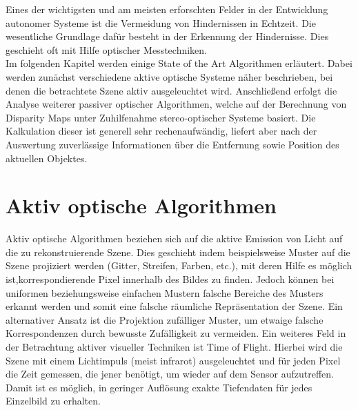 Eines der wichtigsten und am meisten erforschten Felder in der Entwicklung autonomer Systeme ist die Vermeidung von Hindernissen in Echtzeit. Die wesentliche Grundlage dafür besteht in der Erkennung der Hindernisse. Dies geschieht oft mit Hilfe optischer Messtechniken.\\

\noindent
Im folgenden Kapitel werden einige State of the Art Algorithmen erläutert. Dabei werden zunächst verschiedene aktive optische Systeme näher beschrieben, bei denen die betrachtete Szene aktiv ausgeleuchtet wird. Anschließend erfolgt die Analyse weiterer passiver optischer Algorithmen, welche auf der Berechnung von Disparity Maps unter Zuhilfenahme stereo-optischer Systeme basiert. Die Kalkulation dieser ist generell sehr rechenaufwändig, liefert aber nach der Auswertung zuverlässige Informationen über die Entfernung sowie Position des aktuellen Objektes.

\section{Aktiv optische Algorithmen}
\label{sec:kamera_basierte_he}
Aktiv optische Algorithmen beziehen sich auf die aktive Emission von Licht auf die zu rekonstruierende Szene. Dies geschieht indem beispielsweise Muster auf die Szene projiziert werden (Gitter, Streifen, Farben, etc.), mit deren Hilfe es möglich ist,korrespondierende Pixel innerhalb des Bildes zu finden. Jedoch können bei uniformen beziehungsweise einfachen Mustern falsche Bereiche des Musters erkannt werden und somit eine falsche räumliche Repräsentation der Szene. Ein alternativer Ansatz ist die Projektion zufälliger Muster, um etwaige falsche Korrespondenzen durch bewusste Zufälligkeit zu vermeiden. Ein weiteres Feld in der Betrachtung aktiver visueller Techniken ist Time of Flight. Hierbei wird die Szene mit einem Lichtimpuls (meist infrarot) ausgeleuchtet und für jeden Pixel die Zeit gemessen, die jener benötigt, um wieder auf dem Sensor aufzutreffen. Damit ist es möglich, in geringer Auflösung exakte Tiefendaten für jedes Einzelbild zu erhalten.\\

